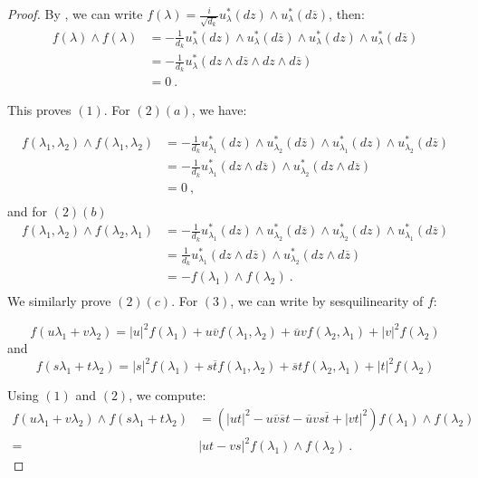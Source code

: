 \documentclass[11pt,letterpaper,english]{amsart}
\numberwithin{equation}{subsection}
\numberwithin{equation}{section}
\theoremstyle{plain}
\theoremstyle{remark}
\begin{document}
\begin{proof}
By , we can write $f(\lambda)=\frac{i}{\sqrt{d_k}}u_\lambda^*(dz)\wedge u_{\lambda}^*(d\overline z) $, then:
\begin{align*}
f(\lambda)\wedge f(\lambda)&=-\frac{1}{d_k}u_\lambda^*(dz)\wedge u_{\lambda}^*(d\overline z)\wedge u_\lambda^*(dz)\wedge u_{\lambda}^*(d\overline z)\\
&=-\frac{1}{d_k}u_{\lambda}^*(dz\wedge d\overline z\wedge dz\wedge d\overline z)\\
&=0~.
\end{align*}

This proves $(1)$. For $(2)$$(a)$, we have: 

\begin{align*}
f(\lambda_1,\lambda_2)\wedge f(\lambda_1,\lambda_2)&=-\frac{1}{d_k}u_{\lambda_1}^*(dz)\wedge u_{\lambda_2}^*(d\overline z)\wedge u_{\lambda_1}^*(dz)\wedge u_{\lambda_2}^*(d\overline z)\\
&= -\frac{1}{d_k}u_{\lambda_1}^*(dz\wedge d\overline z) \wedge u_{\lambda_2}^*(d z\wedge d\overline z)\\
&=0~,\\
\end{align*}
and for $(2)$$(b)$
\begin{align*}
f(\lambda_1,\lambda_2)\wedge f(\lambda_2,\lambda_1)&=-\frac{1}{d_k}u_{\lambda_1}^*(dz)\wedge u_{\lambda_2}^*(d\overline z)\wedge u_{\lambda_2}^*(dz)\wedge u_{\lambda_1}^*(d\overline z)\\
&= \frac{1}{d_k}u_{\lambda_1}^*(dz\wedge d\overline z) \wedge u_{\lambda_2}^*(d z\wedge d\overline z)\\
&=-f(\lambda_1)\wedge f(\lambda_2)~.\\
\end{align*}
We similarly prove $(2)$$(c)$. 
For $(3)$, we can write by sesquilinearity of $f$:

\[f(u\lambda_1+v
\lambda_2)=|u|^2f(\lambda_1)+u\overline v f(\lambda_1,\lambda_2)+\overline u vf(\lambda_2,\lambda_1)+|v|^2f(\lambda_2)\]
and
\[f(s\lambda_1+t
\lambda_2)=|s|^2f(\lambda_1)+s\overline tf(\lambda_1,\lambda_2)+\overline s tf(\lambda_2,\lambda_1)+|t|^2f(\lambda_2)\]

Using $(1)$ and $(2)$, we compute:
\begin{align*}
f(u\lambda_1+v
\lambda_2)\wedge f(s\lambda_1+t
\lambda_2)&=(|ut|^2-u\overline v\overline s t-\overline u vs\overline t+|vt|^2)f(\lambda_1)\wedge f(\lambda_2)\\
=&|ut-vs|^2f(\lambda_1)\wedge f(\lambda_2)~.
\end{align*}
\end{proof}  
\end{document}
